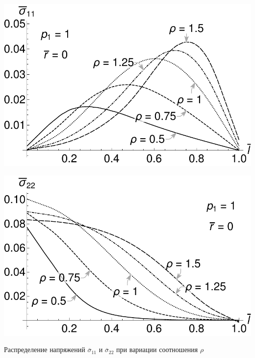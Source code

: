 \begin{frame}
\centering
\begin{minipage}{0.45\textwidth}
	\centering
	\includegraphics[width=\textwidth]{pics/ThermalKirshSigma11Local.pdf} \\
\end{minipage}
\begin{minipage}{0.45\textwidth}
	\centering
	\includegraphics[width=\textwidth]{pics/ThermalKirshSigma22Local.pdf} \\
\end{minipage}

Распределение напряжений $\overline{\sigma}_{11}$ и $\overline{\sigma}_{22}$ при вариации соотношения $\rho$

\bigskip
\bigskip


\end{frame}
